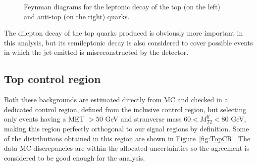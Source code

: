 \documentclass[a4paper, 10pt, openright]{report}
\begin{document}
\begin{figure}[htbp]
\centering
\begin{minipage}[b]{.34\textwidth}
\end{minipage} 
\begin{minipage}[b]{.34\textwidth}
\end{minipage} 
\caption{Feynman diagrams for the leptonic decay of the top (on the left) and anti-top (on the right) quarks.}
\label{fig:TopDecay}
\end{figure}

The dilepton decay of the top quarks produced is obviously more important in this analysis, but its semileptonic decay is also considered to cover possible events in which the jet emitted is misreconstructed by the detector.

\subsection{Top control region} \label{section:TopCR}

Both these backgrounds are estimated directly from \ac{MC} and checked in a dedicated control region, defined from the inclusive control region, but selecting only events having a \ac{MET} $> 50$ GeV and stranverse mass $60 < M_{T2}^{ll} < 80$ GeV, making this region perfectly orthogonal to our signal regions by definition. Some of the distributions obtained in this region are shown in Figure~\ref{fig:TopCR}. The data-\ac{MC} discrepancies are within the allocated uncertainties so the agreement is considered to be good enough for the analysis.
\end{document}
